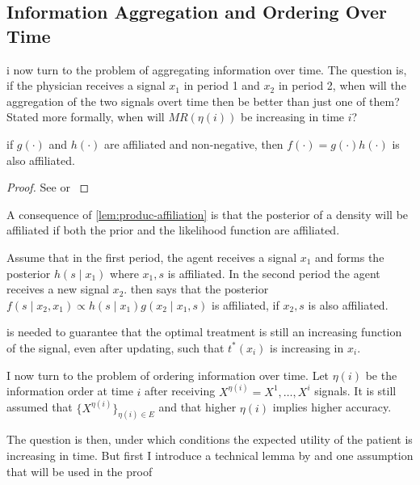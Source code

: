 \documentclass[11pt,a4paper,oneside]{article}
\begin{document}
\subsection{Information Aggregation and Ordering Over Time}
i now turn to the problem of aggregating information over time. The question is, if the physician receives a signal \(x_1\) in period 1 and \(x_2\) in period 2, when will the aggregation of the two signals overt time then be better than just one of them? Stated more formally, when will \(MR(\eta(i))\) be increasing in time \(i\)?

\begin{lemma}\label{lem:produc-affiliation}
	if \(g(\cdot)\) and \(h(\cdot)\) are affiliated and non-negative, then \(f(\cdot)=g(\cdot)h(\cdot)\) is also affiliated.
\end{lemma}
\begin{proof}
	See \textcite{Milgrom1982a} or \textcite[Collary 2.6.3]{Topkis1998}
\end{proof}
A consequence of \cref{lem:produc-affiliation} is that the posterior of a density will be affiliated if both the prior and the likelihood function are affiliated.

\begin{example}
 Assume that in the first period, the agent receives a signal \(x_1\) and forms the posterior \(h(s\mid x_1)\) where \(x_1,s\) is affiliated. In the second period the agent receives a new signal \(x_2\).  then says that the posterior \(f(s\mid x_2,x_1) \propto h(s\mid x_1)g(x_2\mid x_1,s)\) is affiliated, if \(x_2,s\) is also affiliated.
 \end{example}

 is needed to guarantee that the optimal treatment is still an increasing function of the signal, even after updating, such that \(t^*(x_i)\) is increasing in \(x_i\).

I now turn to the problem of ordering information over time. Let \(\eta(i)\) be the information order at time \(i\) after receiving \({X}^{\eta(i)}=X^{1},\ldots,X^{i}\) signals. It is still assumed that \(\{{X}^{\eta(i)}\}_{\eta(i)\in E}\) and that higher \(\eta(i)\) implies higher accuracy.

The question is then, under which conditions the expected utility of the patient is increasing in time. But first I introduce a technical lemma by \textcite{Persico1996} and one assumption that will be used in the proof
\end{document}
